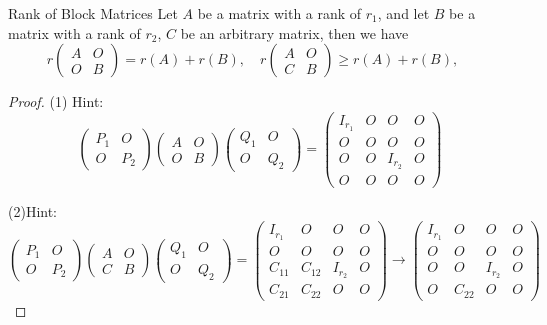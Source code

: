 \begin{lemma}{Rank of Block Matrices}{}
  Let $A$ be a matrix with a rank of $r_1$,
  and let $B$ be a matrix with a rank of $r_2$,
  $C$ be an arbitrary matrix,
  then we have
  \begin{equation}
   r\begin{pmatrix}A&O\\O&B\end{pmatrix}=r(A)+r(B), \quad
   r\begin{pmatrix}A&O\\C&B\end{pmatrix}\geq r(A)+r(B), \quad
  \end{equation}
\end{lemma}

\begin{proof}
  (1) Hint:
  \begin{equation}
    \begin{pmatrix}P_1&O\\O&P_2\end{pmatrix}
    \begin{pmatrix}A&O\\O&B\end{pmatrix}
    \begin{pmatrix}Q_1&O\\O&Q_2\end{pmatrix}
    =\begin{pmatrix}I_{r_1}&O&O&O\\O&O&O&O\\O&O&I_{r_2}&O\\O&O&O&O\end{pmatrix}
  \end{equation}

  (2)Hint: 
  \begin{equation}
    \begin{pmatrix}P_1&O\\O&P_2\end{pmatrix}
    \begin{pmatrix}A&O\\C&B\end{pmatrix}
    \begin{pmatrix}Q_1&O\\O&Q_2\end{pmatrix}
    =\begin{pmatrix}I_{r_1}&O&O&O\\O&O&O&O\\C_{11}&C_{12}&I_{r_2}&O\\C_{21}&C_{22}&O&O\end{pmatrix}\to\begin{pmatrix}I_{r_1}&O&O&O\\O&O&O&O\\O&O&I_{r_2}&O\\O&C_{22}&O&O\end{pmatrix}
  \end{equation}
\end{proof}

